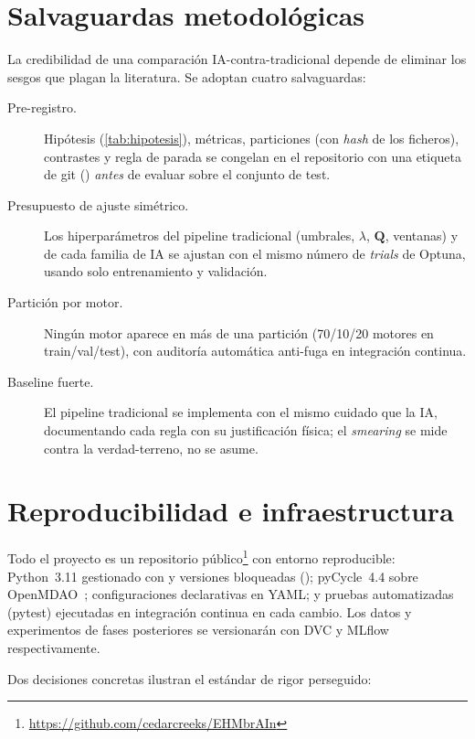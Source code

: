 \section{Salvaguardas metodológicas}
\label{sec:protocolo}

La credibilidad de una comparación IA-contra-tradicional depende de eliminar los sesgos que
plagan la literatura. Se adoptan cuatro salvaguardas:

\begin{description}
  \item[Pre-registro.] Hipótesis (\cref{tab:hipotesis}), métricas, particiones (con \emph{hash}
    de los ficheros), contrastes y regla de parada se congelan en el repositorio con una
    etiqueta de git () \emph{antes} de evaluar sobre el conjunto de test.
  \item[Presupuesto de ajuste simétrico.] Los hiperparámetros del pipeline tradicional
    (umbrales, $\lambda$, $\mathbf{Q}$, ventanas) y de cada familia de IA se ajustan con el
    mismo número de \emph{trials} de Optuna, usando solo entrenamiento y validación.
  \item[Partición por motor.] Ningún motor aparece en más de una partición
    (70/10/20 motores en train/val/test), con auditoría automática anti-fuga en integración
    continua.
  \item[Baseline fuerte.] El pipeline tradicional se implementa con el mismo cuidado que la IA,
    documentando cada regla con su justificación física; el \emph{smearing} se mide contra la
    verdad-terreno, no se asume.
\end{description}

\section{Reproducibilidad e infraestructura}
\label{sec:reproducibilidad}

Todo el proyecto es un repositorio público\footnote{\url{https://github.com/cedarcreeks/EHMbrAIn}}
con entorno reproducible: Python~3.11 gestionado con  y versiones bloqueadas
(); pyCycle~4.4 sobre OpenMDAO~\cite{Gray2019}; configuraciones declarativas en
YAML; y pruebas automatizadas (pytest) ejecutadas en integración continua en cada cambio. Los
datos y experimentos de fases posteriores se versionarán con DVC y MLflow respectivamente.

Dos decisiones concretas ilustran el estándar de rigor perseguido:

